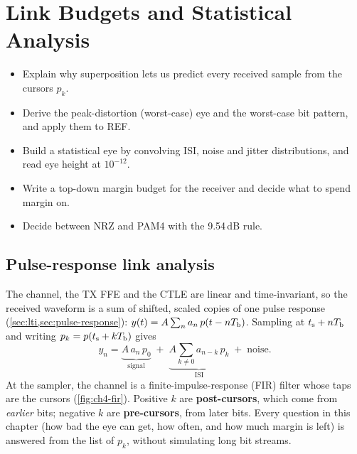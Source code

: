 \chapter{Link Budgets and Statistical Analysis}\label{ch:linkanalysis}
\providecommand{\chFourOhm}{\ensuremath{\Omega}}

\begin{objectives}
\begin{itemize}
  \item Explain why superposition lets us predict every received sample from the cursors $p_k$.
  \item Derive the peak-distortion (worst-case) eye and the worst-case bit pattern, and apply them to REF.
  \item Build a statistical eye by convolving ISI, noise and jitter distributions, and read eye height at $10^{-12}$.
  \item Write a top-down margin budget for the \OS{} receiver and decide what to spend margin on.
  \item Decide between NRZ and PAM4 with the 9.54\,dB rule.
\end{itemize}
\end{objectives}

\section{Pulse-response link analysis}\label{sec:ch4-pulse}

The channel, the TX FFE and the CTLE are linear and time-invariant, so the received waveform is a sum of shifted, scaled copies of one pulse response (\cref{sec:lti,sec:pulse-response}): $y(t) = A\sum_n a_n\,p(t-nT_\mathrm{b})$. Sampling at $t_\mathrm{s} + nT_\mathrm{b}$ and writing $p_k = p(t_\mathrm{s} + kT_\mathrm{b})$ gives
\begin{equation}
  y_n = \underbrace{A\,a_n\,p_0}_{\text{signal}} \;+\; \underbrace{A\sum_{k\neq0} a_{n-k}\,p_k}_{\text{ISI}} \;+\; \text{noise}.
  \label{eq:ch4-yn}
\end{equation}
At the sampler, the channel is a finite-impulse-response (FIR) filter whose taps are the cursors (\cref{fig:ch4-fir}). Positive $k$ are \textbf{post-cursors}, which come from \emph{earlier} bits; negative $k$ are \textbf{pre-cursors}, from later bits. Every question in this chapter (how bad the eye can get, how often, and how much margin is left) is answered from the list of $p_k$, without simulating long bit streams.

